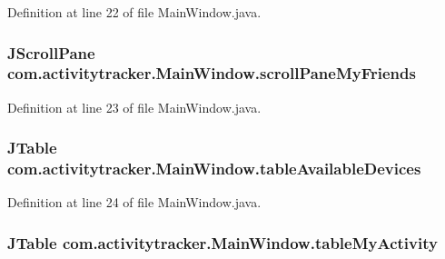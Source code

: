 Definition at line 22 of file Main\+Window.\+java.

\subsubsection[{\texorpdfstring{scroll\+Pane\+My\+Friends}{scrollPaneMyFriends}}]{\setlength{\rightskip}{0pt plus 5cm}J\+Scroll\+Pane com.\+activitytracker.\+Main\+Window.\+scroll\+Pane\+My\+Friends\hspace{0.3cm}{\ttfamily [private]}}\hypertarget{classcom_1_1activitytracker_1_1_main_window_a4ef571b624e78e91f3ccad9234c0b5d3}{}\label{classcom_1_1activitytracker_1_1_main_window_a4ef571b624e78e91f3ccad9234c0b5d3}


Definition at line 23 of file Main\+Window.\+java.

\subsubsection[{\texorpdfstring{table\+Available\+Devices}{tableAvailableDevices}}]{\setlength{\rightskip}{0pt plus 5cm}J\+Table com.\+activitytracker.\+Main\+Window.\+table\+Available\+Devices\hspace{0.3cm}{\ttfamily [private]}}\hypertarget{classcom_1_1activitytracker_1_1_main_window_a50012386053e035e7ae0fb993153b225}{}\label{classcom_1_1activitytracker_1_1_main_window_a50012386053e035e7ae0fb993153b225}


Definition at line 24 of file Main\+Window.\+java.

\subsubsection[{\texorpdfstring{table\+My\+Activity}{tableMyActivity}}]{\setlength{\rightskip}{0pt plus 5cm}J\+Table com.\+activitytracker.\+Main\+Window.\+table\+My\+Activity\hspace{0.3cm}{\ttfamily [private]}}\hypertarget{classcom_1_1activitytracker_1_1_main_window_a0ad6d3ca1298275eba15a9ea189d4d9b}{}\label{classcom_1_1activitytracker_1_1_main_window_a0ad6d3ca1298275eba15a9ea189d4d9b}


